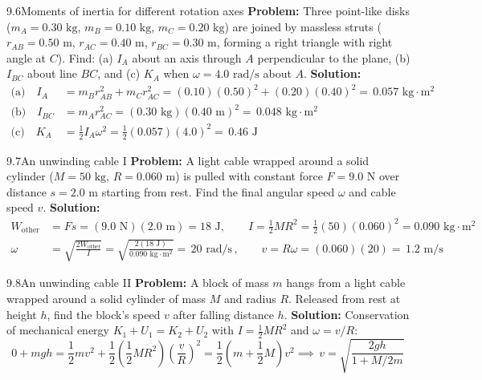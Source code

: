 \documentclass[11pt,a4paper,openany,oneside]{book}
\newcommand{\eqbox}[1]{\boxed{\,#1\,}}
\numberwithin{equation}{chapter}
\newcommand{\bk}[1]{\texorpdfstring{\enspace{\normalfont\small\color{slate}[Book #1]}}{ [Book #1]}}
\begin{document}
\begin{example}{9.6}{Moments of inertia for different rotation axes\bk{p.\ 290}}
\textbf{Problem:} Three point-like disks ($m_A = 0.30\text{ kg}$, $m_B = 0.10\text{ kg}$, $m_C = 0.20\text{ kg}$) are joined by massless struts ($r_{AB} = 0.50\text{ m}$, $r_{AC} = 0.40\text{ m}$, $r_{BC} = 0.30\text{ m}$, forming a right triangle with right angle at $C$). Find: (a) $I_A$ about an axis through $A$ perpendicular to the plane, (b) $I_{BC}$ about line $BC$, and (c) $K_A$ when $\omega = 4.0\text{ rad/s}$ about $A$.
\tcblower
\textbf{Solution:}
\begin{align*}
  \text{(a)}\quad I_A &= m_B r_{AB}^2 + m_C r_{AC}^2 = (0.10)(0.50)^2 + (0.20)(0.40)^2 = \eqbox{0.057\text{ kg}\cdot\text{m}^2}\\
  \text{(b)}\quad I_{BC} &= m_A r_{AC}^2 = (0.30\text{ kg})(0.40\text{ m})^2 = \eqbox{0.048\text{ kg}\cdot\text{m}^2}\\
  \text{(c)}\quad K_A &= \frac{1}{2}I_A\omega^2 = \frac{1}{2}(0.057)(4.0)^2 = \eqbox{0.46\text{ J}}
\end{align*}
\end{example}

\begin{example}{9.7}{An unwinding cable I\bk{p.\ 291}}
\textbf{Problem:} A light cable wrapped around a solid cylinder ($M = 50\text{ kg}$, $R = 0.060\text{ m}$) is pulled with constant force $F = 9.0\text{ N}$ over distance $s = 2.0\text{ m}$ starting from rest. Find the final angular speed $\omega$ and cable speed $v$.
\tcblower
\textbf{Solution:}
\begin{align*}
  W_{\text{other}} &= Fs = (9.0\text{ N})(2.0\text{ m}) = 18\text{ J}, \qquad I = \frac{1}{2}MR^2 = \frac{1}{2}(50)(0.060)^2 = 0.090\text{ kg}\cdot\text{m}^2\\
  \omega &= \sqrt{\frac{2W_{\text{other}}}{I}} = \sqrt{\frac{2(18\text{ J})}{0.090\text{ kg}\cdot\text{m}^2}} = \eqbox{20\text{ rad/s}}, \qquad v = R\omega = (0.060)(20) = \eqbox{1.2\text{ m/s}}
\end{align*}
\end{example}

\begin{example}{9.8}{An unwinding cable II\bk{p.\ 292}}
\textbf{Problem:} A block of mass $m$ hangs from a light cable wrapped around a solid cylinder of mass $M$ and radius $R$. Released from rest at height $h$, find the block's speed $v$ after falling distance $h$.
\tcblower
\textbf{Solution:} Conservation of mechanical energy $K_1 + U_1 = K_2 + U_2$ with $I = \frac{1}{2}MR^2$ and $\omega = v/R$:
\begin{equation*}
  0 + mgh = \frac{1}{2}mv^2 + \frac{1}{2}\!\left(\frac{1}{2}MR^2\right)\!\left(\frac{v}{R}\right)^2 = \frac{1}{2}\!\left(m + \frac{1}{2}M\right)v^2 \implies \eqbox{v = \sqrt{\frac{2gh}{1 + M/2m}}}
\end{equation*}
\end{example}
\end{document}
